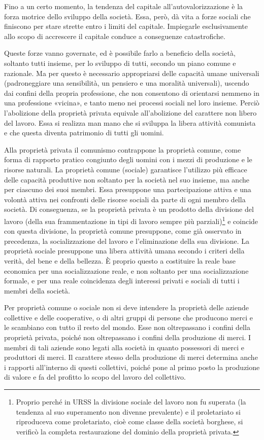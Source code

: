 \documentclass[../main]{subfiles}
\begin{document}
Fino a un certo momento, la tendenza del capitale all'autovalorizzazione è la forza motrice dello sviluppo della società. Essa, però, dà vita a forze sociali che finiscono per stare strette entro i limiti del capitale. Impiegarle esclusivamente allo scopo di accrescere il capitale conduce a conseguenze catastrofiche.

Queste forze vanno governate, ed è possibile farlo a beneficio della società, soltanto tutti insieme, per lo sviluppo di tutti, secondo un piano comune e razionale. Ma per questo è necessario appropriarsi delle capacità umane universali (padroneggiare una sensibilità, un pensiero e una moralità universali), uscendo dai confini della propria professione, che non consentono di orientarsi nemmeno in una professione «vicina», e tanto meno nei processi sociali nel loro insieme. Perciò l'abolizione della proprietà privata equivale all'abolizione del carattere non libero del lavoro. Essa si realizza man mano che si sviluppa la libera attività comunista e che questa diventa patrimonio di tutti gli uomini.

Alla proprietà privata il comunismo contrappone la proprietà comune, come forma di rapporto pratico congiunto degli uomini con i mezzi di produzione e le risorse naturali. La proprietà comune (sociale) garantisce l'utilizzo più efficace delle capacità produttive non soltanto per la società nel suo insieme, ma anche per ciascuno dei suoi membri. Essa presuppone una partecipazione attiva e una volontà attiva nei confronti delle risorse sociali da parte di ogni membro della società. Di conseguenza, se la proprietà privata è un prodotto della divisione del lavoro (della sua frammentazione in tipi di lavoro sempre più parziali)\footnote{Proprio perché in URSS la divisione sociale del lavoro non fu superata (la tendenza al suo superamento non divenne prevalente) e il proletariato si riproduceva come proletariato, cioè come classe della società borghese, si verificò la completa restaurazione del dominio della proprietà privata.} e coincide con questa divisione, la proprietà comune presuppone, come già osservato in precedenza, la socializzazione del lavoro e l'eliminazione della sua divisione. La proprietà sociale presuppone una libera attività umana secondo i criteri della verità, del bene e della bellezza. È proprio questo a costituire la reale base economica per una socializzazione reale, e non soltanto per una socializzazione formale, e per una reale coincidenza degli interessi privati e sociali di tutti i membri della società.

Per proprietà comune o sociale non si deve intendere la proprietà delle aziende collettive e delle cooperative, o di altri gruppi di persone che producono merci e le scambiano con tutto il resto del mondo. Esse non oltrepassano i confini della proprietà privata, poiché non oltrepassano i confini della produzione di merci. I membri di tali aziende sono legati alla società in quanto possessori di merci e produttori di merci. Il carattere stesso della produzione di merci determina anche i rapporti all'interno di questi collettivi, poiché pone al primo posto la produzione di valore e fa del profitto lo scopo del lavoro del collettivo.
\end{document}
